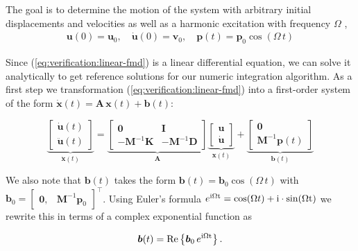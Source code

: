 The goal is to determine the motion of the system with arbitrary initial displacements and velocities as well as a harmonic excitation with frequency $\Omega$ ,
%
\begin{align}
\boldsymbol{u}(0) = \boldsymbol{u}_{0},\quad \dot{\boldsymbol{u}}(0) = \boldsymbol{v}_{0},\quad \boldsymbol{p}(t) = \boldsymbol{p}_{0}\cos(\Omega\,t)
\end{align}

Since (\ref{eq:verification:linear-fmd}) is a linear differential equation, we can solve it analytically to get reference solutions for our numeric integration algorithm.
As a first step we transformation (\ref{eq:verification:linear-fmd}) into a first-order system of the form $\dot{\boldsymbol{x}}(t) = \boldsymbol{A}\,\boldsymbol{x}(t) + \boldsymbol{b}(t)$:

\begin{equation}
\underbrace{
\begin{bmatrix} \dot{\boldsymbol{u}}(t) \\ \ddot{\boldsymbol{u}}(t) \end{bmatrix}
}_{\dot{\boldsymbol{x}}(t)}
=
\underbrace{
\begin{bmatrix}
\boldsymbol{0} & \boldsymbol{I} \\
-\boldsymbol{M}^{-1}\boldsymbol{K} & -\boldsymbol{M}^{-1}\boldsymbol{D}
\end{bmatrix}
}_{\boldsymbol{A}}
\underbrace{
\begin{bmatrix} \boldsymbol{u} \\ \dot{\boldsymbol{u}} \end{bmatrix}
}_{\boldsymbol{x}(t)}
+
\underbrace{
\begin{bmatrix}
\boldsymbol{0} \\
\boldsymbol{M}^{-1}\boldsymbol{p}(t)
\end{bmatrix}
}_{\boldsymbol{b}(t)}
\end{equation}

We also note that $\boldsymbol{b}(t)$ takes the form $\boldsymbol{b}(t) = \boldsymbol{b}_{0}\cos(\Omega\,t)$ with $\boldsymbol{b}_{0} = \begin{bmatrix}
\boldsymbol{0}, & \boldsymbol{M}^{-1}\boldsymbol{p}_{0}
\end{bmatrix}^\intercal$.
Using Euler's formula $e^{\rm{i}\Omega t} = \cos(\Omega t) + \rm{i}\cdot\sin(\Omega t)$ we rewrite this in terms of a complex exponential function as

\begin{equation}
\boldsymbol{b}(t) = \operatorname{Re}\left\{\boldsymbol{b}_{0}\,e^{\rm{i}\Omega t}\right\}.
\end{equation}

